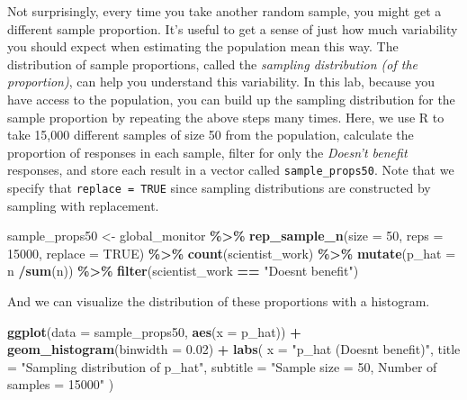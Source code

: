\documentclass[
]{article}
\newenvironment{Shaded}{\begin{snugshade}}{\end{snugshade}}
\newcommand{\AttributeTok}[1]{\textcolor[rgb]{0.13,0.29,0.53}{#1}}
\newcommand{\ConstantTok}[1]{\textcolor[rgb]{0.56,0.35,0.01}{#1}}
\newcommand{\DecValTok}[1]{\textcolor[rgb]{0.00,0.00,0.81}{#1}}
\newcommand{\FloatTok}[1]{\textcolor[rgb]{0.00,0.00,0.81}{#1}}
\newcommand{\FunctionTok}[1]{\textcolor[rgb]{0.13,0.29,0.53}{\textbf{#1}}}
\newcommand{\NormalTok}[1]{#1}
\newcommand{\OtherTok}[1]{\textcolor[rgb]{0.56,0.35,0.01}{#1}}
\newcommand{\SpecialCharTok}[1]{\textcolor[rgb]{0.81,0.36,0.00}{\textbf{#1}}}
\newcommand{\StringTok}[1]{\textcolor[rgb]{0.31,0.60,0.02}{#1}}
\begin{document}
Not surprisingly, every time you take another random sample, you might
get a different sample proportion. It's useful to get a sense of just
how much variability you should expect when estimating the population
mean this way. The distribution of sample proportions, called the
\emph{sampling distribution (of the proportion)}, can help you
understand this variability. In this lab, because you have access to the
population, you can build up the sampling distribution for the sample
proportion by repeating the above steps many times. Here, we use R to
take 15,000 different samples of size 50 from the population, calculate
the proportion of responses in each sample, filter for only the
\emph{Doesn't benefit} responses, and store each result in a vector
called \texttt{sample\_props50}. Note that we specify that
\texttt{replace\ =\ TRUE} since sampling distributions are constructed
by sampling with replacement.

\begin{Shaded}
\begin{Highlighting}[]
\NormalTok{sample\_props50 }\OtherTok{\textless{}{-}}\NormalTok{ global\_monitor }\SpecialCharTok{\%\textgreater{}\%}
                    \FunctionTok{rep\_sample\_n}\NormalTok{(}\AttributeTok{size =} \DecValTok{50}\NormalTok{, }\AttributeTok{reps =} \DecValTok{15000}\NormalTok{, }\AttributeTok{replace =} \ConstantTok{TRUE}\NormalTok{) }\SpecialCharTok{\%\textgreater{}\%}
                    \FunctionTok{count}\NormalTok{(scientist\_work) }\SpecialCharTok{\%\textgreater{}\%}
                    \FunctionTok{mutate}\NormalTok{(}\AttributeTok{p\_hat =}\NormalTok{ n }\SpecialCharTok{/}\FunctionTok{sum}\NormalTok{(n)) }\SpecialCharTok{\%\textgreater{}\%}
                    \FunctionTok{filter}\NormalTok{(scientist\_work }\SpecialCharTok{==} \StringTok{"Doesn\textquotesingle{}t benefit"}\NormalTok{)}
\end{Highlighting}
\end{Shaded}

And we can visualize the distribution of these proportions with a
histogram.

\begin{Shaded}
\begin{Highlighting}[]
\FunctionTok{ggplot}\NormalTok{(}\AttributeTok{data =}\NormalTok{ sample\_props50, }\FunctionTok{aes}\NormalTok{(}\AttributeTok{x =}\NormalTok{ p\_hat)) }\SpecialCharTok{+}
  \FunctionTok{geom\_histogram}\NormalTok{(}\AttributeTok{binwidth =} \FloatTok{0.02}\NormalTok{) }\SpecialCharTok{+}
  \FunctionTok{labs}\NormalTok{(}
    \AttributeTok{x =} \StringTok{"p\_hat (Doesn\textquotesingle{}t benefit)"}\NormalTok{,}
    \AttributeTok{title =} \StringTok{"Sampling distribution of p\_hat"}\NormalTok{,}
    \AttributeTok{subtitle =} \StringTok{"Sample size = 50, Number of samples = 15000"}
\NormalTok{  )}
\end{Highlighting}
\end{Shaded}
\end{document}

